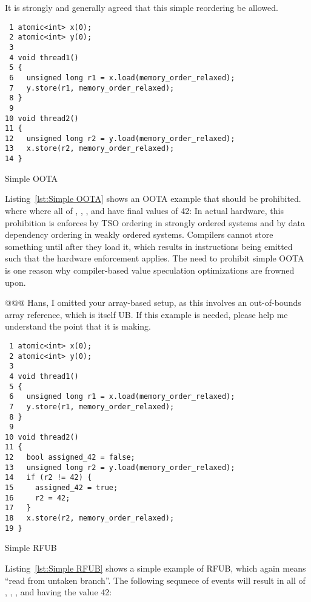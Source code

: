 \documentclass[10]{article}
\begin{document}
It is strongly and generally agreed that this simple reordering be
allowed.

\begin{listing}[tbp]
\begin{verbatim}
 1 atomic<int> x(0);
 2 atomic<int> y(0);
 3
 4 void thread1()
 5 {
 6   unsigned long r1 = x.load(memory_order_relaxed);
 7   y.store(r1, memory_order_relaxed);
 8 }
 9
10 void thread2()
11 {
12   unsigned long r2 = y.load(memory_order_relaxed);
13   x.store(r2, memory_order_relaxed);
14 }
\end{verbatim}
\caption{Simple OOTA}
\label{lst:Simple OOTA}
\end{listing}

Listing~\ref{lst:Simple OOTA} shows an OOTA example that should be
prohibited.
where where all of , , , and  have final values
of 42:
In actual hardware, this prohibition is enforces by TSO ordering in
strongly ordered systems and by data dependency ordering in weakly
ordered systems.
Compilers cannot store something until after they load it, which
results in instructions being emitted such that the hardware enforcement
applies.
The need to prohibit simple OOTA is one reason why compiler-based
value speculation optimizations are frowned upon.

@@@ Hans, I omitted your array-based setup, as this involves an
out-of-bounds array reference, which is itself UB.
If this example is needed, please help me understand the point that
it is making.

\begin{listing}[tbp]
\begin{verbatim}
 1 atomic<int> x(0);
 2 atomic<int> y(0);
 3
 4 void thread1()
 5 {
 6   unsigned long r1 = x.load(memory_order_relaxed);
 7   y.store(r1, memory_order_relaxed);
 8 }
 9
10 void thread2()
11 {
12   bool assigned_42 = false;
13   unsigned long r2 = y.load(memory_order_relaxed);
14   if (r2 != 42) {
15     assigned_42 = true;
16     r2 = 42;
17   }
18   x.store(r2, memory_order_relaxed);
19 }
\end{verbatim}
\caption{Simple RFUB}
\label{lst:Simple RFUB}
\end{listing}

Listing~\ref{lst:Simple RFUB}
shows a simple example of RFUB, which again means ``read from untaken
branch''.
The following sequnece of events will result in all of , ,
, and  having the value 42:
\end{document}
